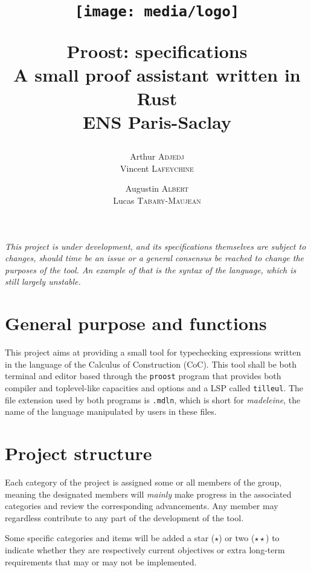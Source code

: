 \documentclass[twocolumn]{article}
\author{
  Arthur \textsc{Adjedj}\\
  Vincent \textsc{Lafeychine} \and
  Augustin \textsc{Albert} \\
  Lucas \textsc{Tabary-Maujean}
}
\title{
  \texttt{[image: media/logo]}

  \textbf{Proost: specifications}\\
  \large A small proof assistant written in Rust
  \\[1\baselineskip]\normalsize ENS Paris-Saclay
}
\newcommand{\etun}{{\color{Green} ($\star$)} }
\newcommand{\etde}{{\color{Orange} ($\star\star$)} }
\begin{document}
\thispagestyle{fancy}
\maketitle

\emph{
	This project is under development, and its specifications themselves are
	subject to changes, should time be an issue or a general consensus be reached
	to change the purposes of the tool. An example of that is the syntax of the
	language, which is still largely unstable. }

\section{General purpose and functions}
This project aims at providing a small tool for typechecking expressions written
in the language of the Calculus of Construction (CoC). This tool shall be both
terminal and editor based through the \texttt{proost} program that provides both
compiler and toplevel-like capacities and options and a LSP called
\texttt{tilleul}. The file extension used by both programs is \texttt{.mdln},
which is short for \emph{madeleine}, the name of the language manipulated by
users in these files.


\section{Project structure}
Each category of the project is assigned some or all members of the group,
meaning the designated members will \emph{mainly} make progress in the
associated categories and review the corresponding advancements. Any member may
regardless contribute to any part of the development of the tool.

Some specific categories and items will be added a star \etun or two \etde to
indicate whether they are respectively current objectives or extra long-term
requirements that may or may not be implemented.
\end{document}

